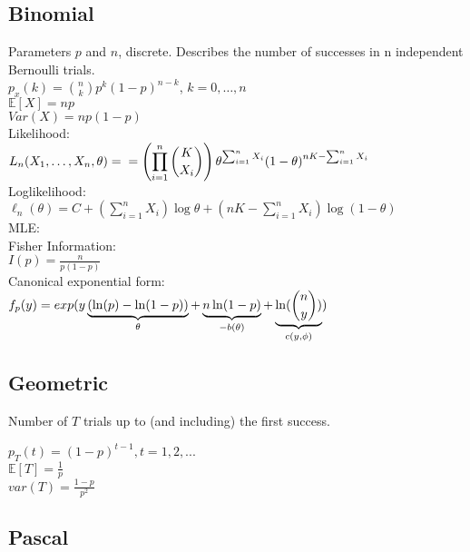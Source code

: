 \subsection*{Binomial}
Parameters $p$ and $n$, discrete. Describes the number of successes
in n independent Bernoulli trials.\\

$p_x(k)= {n\choose k}{p}^{k} \left( 1-p \right) ^{n-k}$, $k=0,\ldots, n$\\

$\mathbb{E}[X]=np$\\

$Var(X)= np(1-p)$ \\

Likelihood:\\

$\displaystyle  L_ n(X_1, \ldots , X_ n, \theta ) =\\
= \left( \prod _{i = 1}^ n \binom {K}{X_ i} \right) \theta ^{\sum _{i = 1}^ n X_ i} (1 - \theta )^{nK - \sum _{i = 1}^ n X_ i }$\\

Loglikelihood:\\

$\ell_n (\theta) = C + \left( \sum _{i = 1}^ n X_ i \right) \log \theta + \left( nK - \sum _{i = 1}^ n X_ i \right) \log (1 - \theta )$\\

MLE:\\


Fisher Information:\\

$I(p) = \frac{n}{p(1-p)}$\\

Canonical exponential form:\\

$f_ p(y) =\\  
exp (y \underbrace{(\ln (p)-\ln (1-p))}_{\theta } + \underbrace{n\ln (1-p)}_{-b(\theta )} +\underbrace{\ln(\binom {n}{y})}_{c(y,\phi )} )$

\subsection*{Geometric}
Number of $T$ trials up to (and including) the first success. 

$p_T(t) = (1-p)^{t-1}, t=1,2,...$\\
$\mathbb{E}[T]=\frac{1}{p}$\\
$var(T)=\frac{1-p}{p^2}$

\subsection*{Pascal}

